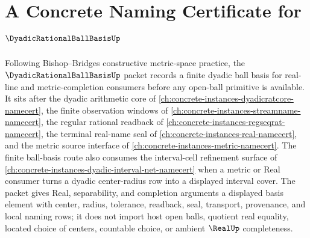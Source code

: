 \chapter{A Concrete Naming Certificate for $\DyadicRationalBallBasisUp$}
\label{ch:concrete-instances-dyadic-rational-ball-basis-namecert}

Following Bishop--Bridges constructive metric-space practice, the $\DyadicRationalBallBasisUp$ packet records a finite dyadic ball basis for real-line and metric-completion consumers before any open-ball primitive is available. It sits after the dyadic arithmetic core of \autoref{ch:concrete-instances-dyadicratcore-namecert}, the finite observation windows of \autoref{ch:concrete-instances-streamname-namecert}, the regular rational readback of \autoref{ch:concrete-instances-regseqrat-namecert}, the terminal real-name seal of \autoref{ch:concrete-instances-real-namecert}, and the metric source interface of \autoref{ch:concrete-instances-metric-namecert}. The finite ball-basis route also consumes the interval-cell refinement surface of \autoref{ch:concrete-instances-dyadic-interval-net-namecert} when a metric or Real consumer turns a dyadic center-radius row into a displayed interval cover. The packet gives Real, separability, and completion arguments a displayed basis element with center, radius, tolerance, readback, seal, transport, provenance, and local naming rows; it does not import host open balls, quotient real equality, located choice of centers, countable choice, or ambient $\RealUp$ completeness.

